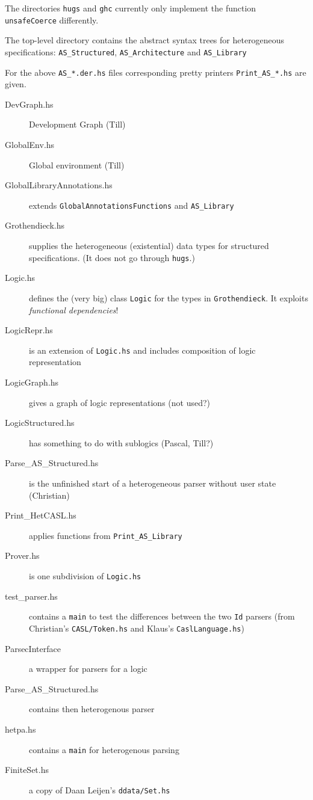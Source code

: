 \documentclass{article}
\begin{document}
The directories \texttt{hugs} and \texttt{ghc} currently only implement the function \texttt{unsafeCoerce} differently. 

The top-level directory contains the abstract syntax trees for
heterogeneous specifications: \texttt{AS\_Structured}, \texttt{AS\_Architecture} and \texttt{AS\_Library}

For the above \texttt{AS\_*.der.hs} files corresponding pretty
printers \texttt{Print\_AS\_*.hs} are given. 

\begin{description}
\item[DevGraph.hs] Development Graph (Till)
\item[GlobalEnv.hs] Global environment (Till)
\item[GlobalLibraryAnnotations.hs] extends \texttt{GlobalAnnotationsFunctions} and \texttt{AS\_Library}
\item[Grothendieck.hs] supplies the heterogeneous (existential) data
  types for structured specifications. (It does not go through \texttt{hugs}.)
\item[Logic.hs] defines the (very big) class \texttt{Logic} for the
  types in \texttt{Grothendieck}. It exploits \emph{functional
    dependencies}!
\item[LogicRepr.hs] is an extension of \texttt{Logic.hs} and includes
  composition of logic representation
\item[LogicGraph.hs] gives a graph of logic representations (not used?)
\item[LogicStructured.hs] has something to do with sublogics (Pascal, Till?)
\item[Parse\_AS\_Structured.hs] is the unfinished start of a heterogeneous
  parser without user state (Christian)
\item[Print\_HetCASL.hs] applies functions from \texttt{Print\_AS\_Library}
\item[Prover.hs] is one subdivision of \texttt{Logic.hs}
\item[test\_parser.hs] contains a \texttt{main} to test the differences
  between the two \texttt{Id} parsers (from Christian's
  \texttt{CASL/Token.hs} and Klaus's \texttt{CaslLanguage.hs})
\item[ParsecInterface] a wrapper for parsers for a logic
\item[Parse\_AS\_Structured.hs] contains then heterogenous parser
\item[hetpa.hs] contains a \texttt{main} for heterogenous parsing
\item[FiniteSet.hs] a copy of Daan Leijen's \texttt{ddata/Set.hs} 
\end{description}
\end{document}
